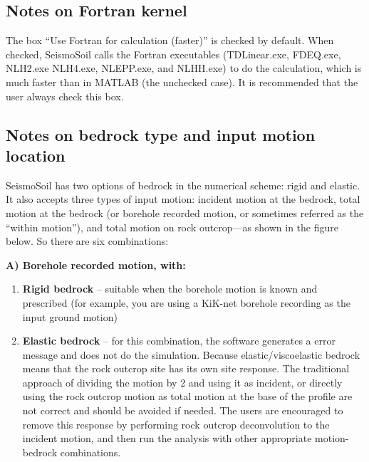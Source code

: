 \documentclass[11pt,letterpaper]{article}
\begin{document}
\subsection{Notes on Fortran kernel}

The box ``Use Fortran for calculation (faster)'' is checked by default. When checked, SeismoSoil calls the Fortran executables ({\textsf{TDLinear.exe}}, {\textsf{FDEQ.exe}}, {\textsf{NLH2.exe}}  {\textsf{NLH4.exe}}, {\textsf{NLEPP.exe}}, and \textsf{NLHH.exe}) to do the calculation, which is much faster than in MATLAB (the unchecked case). It is recommended that the user always check this box.

\newpage
\subsection{Notes on bedrock type and input motion location}\label{sec:bedrock-type-and-motion-location}

SeismoSoil has two options of bedrock in the numerical scheme: rigid and elastic. It also accepts three types of input motion: incident motion at the bedrock, total motion at the bedrock (or borehole recorded motion, or sometimes referred as the ``within motion''), and total motion on rock outcrop---as shown in the figure below. So there are six combinations:

\noindent\textbf{A)	Borehole recorded motion, with:}
\vspace{-10pt}
\begin{enumerate}
\item \textbf{Rigid bedrock} -- suitable when the borehole motion is known and prescribed (for example, you are using a KiK-net borehole recording as the input ground motion)
\item \textbf{Elastic bedrock} -- for this combination, the software generates a error message and does not do the simulation. Because elastic/viscoelastic bedrock means that the rock outcrop site has its own site response. The traditional approach of dividing the motion by 2 and using it as incident, or directly using the rock outcrop motion as total motion at the base of the profile are not correct and should be avoided if needed. The users are encouraged to remove this response by performing rock outcrop deconvolution to the incident motion, and then run the analysis with other appropriate motion-bedrock combinations.
\end{enumerate}
\end{document}
